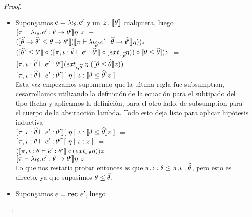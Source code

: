 \begin{proof}
\begin{itemize}
\begin{itemize}
\item Supongamos $e = \lambda \iota_{\theta} . e'$ y un $z : \llbracket \theta \rrbracket$ cualquiera, luego\\

$\semBrcks{\pi \vdash \clambda{\iota}{\theta}{e'} : \theta \rightarrow \theta'}\eta \ z$ $=$\\
$(\llbracket \widehat{\theta} \rightarrow \widehat{\theta}' \leq \theta \rightarrow \theta' \rrbracket
(\llbracket \pi \vdash \lambda \iota_{\widehat{\theta}} . e' : \widehat{\theta} \rightarrow \widehat{\theta}' \rrbracket\eta))z$
$=$\\
$(\llbracket \widehat{\theta}' \leq \theta' \rrbracket 
	\circ
(\llbracket \pi,\iota:\widehat{\theta} \vdash e' : \widehat{\theta}' \rrbracket \circ (ext_{\iota,\widehat{\theta}}\eta))
	\circ
\llbracket \theta \leq \widehat{\theta} \rrbracket) z$ $=$\\
$\llbracket \pi,\iota:\widehat{\theta} \vdash e' : \theta' \rrbracket
		(ext_{\iota,\widehat{\theta}} \ \eta \ (\llbracket \theta \leq \widehat{\theta} \rrbracket z))$ $=$\\
$\semBrcks{\pi,\iota:\thetahat \vdash e' : \theta'}
		[ \ \eta \ | \ \iota:\semBrcks{\theta \leq \thetahat}z \ ]$\\

Esta vez empezamos suponiendo que la ultima regla fue subsumption, desarrollamos
utilizando la definici\'on de la ecuaci\'on para el subtipado del tipo flecha y
aplicamos la definici\'on, para el otro lado, de subsumption para el cuerpo de la 
abstracci\'on lambda. Todo esto deja listo para aplicar hip\'otesis inductiva\\

$\semBrcks{\pi,\iota:\thetahat \vdash e' : \theta'}
		[ \ \eta \ | \ \iota:\semBrcks{\theta \leq \thetahat}z \ ]$ $=$\\
$\llbracket \pi,\iota:\theta \vdash e' : \theta' \rrbracket [ \ \eta \ | \ \iota:z \ ]$ $=$\\
$(\llbracket \pi,\iota:\theta \vdash e' : \theta' \rrbracket \circ (ext_{\iota,\theta} \eta)) z$ $=$\\
$\semBrcks{\pi \vdash \clambda{\iota}{\theta}{e'} : \theta \rightarrow \theta'}\eta \ z$\\

Lo que nos restar\'ia probar entonces es que $\pi,\iota:\theta \leq \pi,\iota:\widehat{\theta}$,
pero esto es directo, ya que supusimos $\theta \leq \widehat{\theta}$.

\item Supongamos $e = \textbf{rec} \ e'$, luego \\


\end{itemize}
\end{itemize}
\end{proof}

